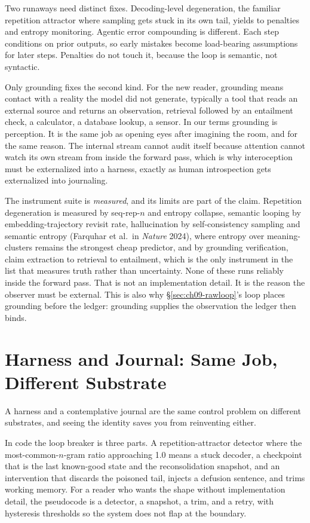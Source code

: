 Two runaways need distinct fixes. Decoding-level degeneration, the familiar repetition attractor where sampling gets stuck in its own tail, yields to penalties and entropy monitoring. Agentic error compounding is different. Each step conditions on prior outputs, so early mistakes become load-bearing assumptions for later steps. Penalties do not touch it, because the loop is semantic, not syntactic.

Only grounding fixes the second kind. For the new reader, grounding means contact with a reality the model did not generate, typically a tool that reads an external source and returns an observation, retrieval followed by an entailment check, a calculator, a database lookup, a sensor. In our terms grounding is perception. It is the same job as opening eyes after imagining the room, and for the same reason. The internal stream cannot audit itself because attention cannot watch its own stream from inside the forward pass, which is why interoception must be externalized into a harness, exactly as human introspection gets externalized into journaling.

The instrument suite is \textit{measured}, and its limits are part of the claim. Repetition degeneration is measured by seq-rep-$n$ and entropy collapse, semantic looping by embedding-trajectory revisit rate, hallucination by self-consistency sampling and semantic entropy (Farquhar et al.\ in \textit{Nature} 2024), where entropy over meaning-clusters remains the strongest cheap predictor, and by grounding verification, claim extraction to retrieval to entailment, which is the only instrument in the list that measures truth rather than uncertainty. None of these runs reliably inside the forward pass. That is not an implementation detail. It is the reason the observer must be external. This is also why \S\ref{sec:ch09-rawloop}'s loop places grounding before the ledger: grounding supplies the observation the ledger then binds.

\section{Harness and Journal: Same Job, Different Substrate}
\label{sec:ch09-harness}

A harness and a contemplative journal are the same control problem on different substrates, and seeing the identity saves you from reinventing either.

In code the loop breaker is three parts. A repetition-attractor detector where the most-common-$n$-gram ratio approaching 1.0 means a stuck decoder, a checkpoint that is the last known-good state and the reconsolidation snapshot, and an intervention that discards the poisoned tail, injects a defusion sentence, and trims working memory. For a reader who wants the shape without implementation detail, the pseudocode is a detector, a snapshot, a trim, and a retry, with hysteresis thresholds so the system does not flap at the boundary.

